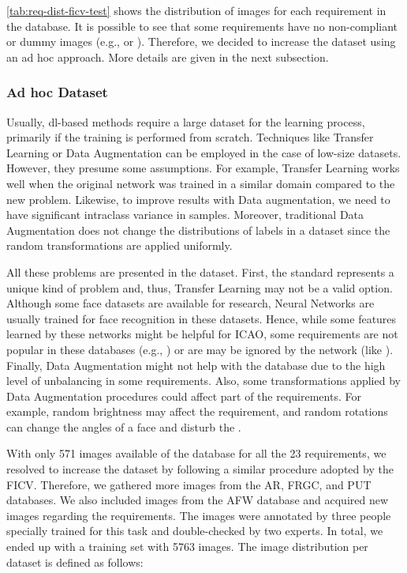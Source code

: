 \autoref{tab:req-dist-ficv-test} shows the distribution of images for each requirement in the \ficvtest database. It is possible to see that some requirements have no non-compliant or dummy images (e.g., \citeReq{\inkmarked} or \citeReq{\framestooheavy}). Therefore, we decided to increase the \ficvtest dataset using an ad hoc approach. More details are given in the next subsection.



\subsubsection{Ad hoc Dataset}

 Usually, \acl{dl}-based methods require a large dataset for the learning process, primarily if the training is performed from scratch. Techniques like Transfer Learning or Data Augmentation can be employed in the case of low-size datasets. However, they presume some assumptions. For example, Transfer Learning works well when the original network was trained in a similar domain compared to the new problem. Likewise, to improve results with Data augmentation, we need to have significant intraclass variance in samples. Moreover, traditional Data Augmentation does not change the distributions of labels in a dataset since the random transformations are applied uniformly. 
 
 All these problems are presented in the \ficvtest dataset. First, the \icao standard represents a unique kind of problem and, thus, Transfer Learning may not be a valid option. Although some face datasets are available for research, Neural Networks are usually trained for face recognition in these datasets. Hence, while some features learned by these networks might be helpful for ICAO, some requirements are not popular in these databases (e.g., \citeReq{\inkmarked}) or are may be ignored by the network (like \citeReq{\variedbackground}). Finally, Data Augmentation might not help with the \ficvtest database due to the high level of unbalancing in some requirements. Also, some transformations applied by Data Augmentation procedures could affect part of the requirements. For example, random brightness may affect the  \citeReq{\toodarklight} requirement, and random rotations can change the angles of a face and disturb the \citeReq{\rollpitchyaw}.
 
 With only 571 images available of the \ficvtest database for all the 23 requirements, we resolved to increase the dataset by following a similar procedure adopted by the FICV. Therefore, we gathered more images from the AR, FRGC, and PUT databases. We also included images from the AFW database \citep{databaseAFW} and acquired new images regarding the \icao requirements. The images were annotated by three people specially trained for this task and double-checked by two experts. In total, we ended up with a training set with 5763 images. The image distribution per dataset is defined as follows:


